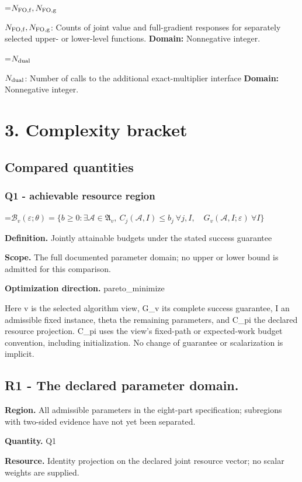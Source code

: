 \documentclass[10pt,a4paper]{article}
\newcommand{\AtlasMath}[1]{\par\begingroup\centering\setbox0=\hbox{$\displaystyle #1$}\ifdim\wd0>1.4\linewidth\typeout{ATLAS WIDE FORMULA: \the\wd0}\fi\ifdim\wd0>\linewidth\resizebox{\linewidth}{!}{\box0}\else\box0\fi\par\endgroup}
\newcommand{\AtlasInlineMath}[1]{\begingroup\setbox0=\hbox{$#1$}\ifdim\wd0>.4\linewidth\endgroup\AtlasMath{#1}\else\endgroup$#1$\fi}
\begin{document}
\AtlasInlineMath{N_{\rm FO,f},N_{\rm FO,g}}: Counts of joint value and full-gradient responses for separately selected upper- or lower-level functions. \textbf{Domain:} Nonnegative integer.

\AtlasInlineMath{N_{\rm dual}}: Number of calls to the additional exact-multiplier interface \textbf{Domain:} Nonnegative integer.

\section{3. Complexity bracket}
\subsection{Compared quantities}
\subsubsection{Q1 - achievable resource region}
\AtlasMath{\mathcal B_v(\varepsilon;\theta)=\{b\ge0:\exists\mathcal A\in\mathfrak A_v,\ C_j(\mathcal A,I)\le b_j\ \forall j,I,\quad G_v(\mathcal A,I;\varepsilon)\ \forall I\}}
\textbf{Definition.} Jointly attainable budgets under the stated success guarantee

\textbf{Scope.} The full documented parameter domain; no upper or lower bound is admitted for this comparison.

\textbf{Optimization direction.} pareto\_minimize

Here v is the selected algorithm view, G\_v its complete success guarantee, I an admissible fixed instance, theta the remaining parameters, and C\_pi the declared resource projection. C\_pi uses the view's fixed-path or expected-work budget convention, including initialization. No change of guarantee or scalarization is implicit.

\subsection{R1 - The declared parameter domain.}
\textbf{Region.} All admissible parameters in the eight-part specification; subregions with two-sided evidence have not yet been separated.

\textbf{Quantity.} Q1

\textbf{Resource.} Identity projection on the declared joint resource vector; no scalar weights are supplied.
\end{document}
